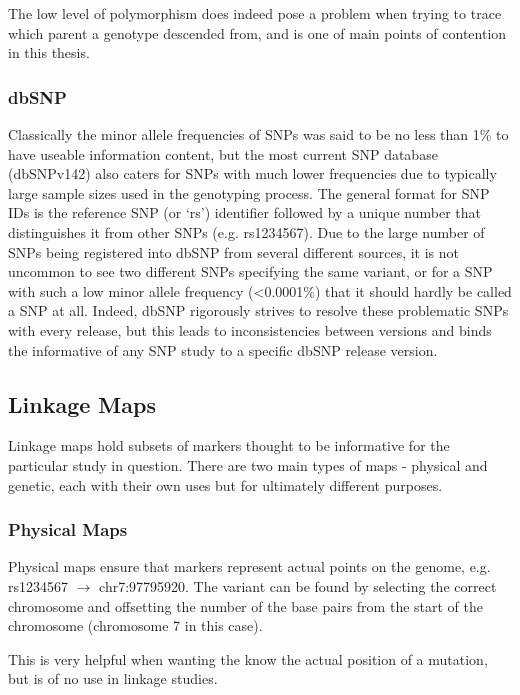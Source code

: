 The low level of polymorphism does indeed pose a problem when trying to trace which parent a genotype descended from, and is one of main points of contention in this thesis. 

\subsubsection{dbSNP}

Classically the minor allele frequencies of SNPs was said to be no less than 1\% to have useable information content, but the most current SNP database (dbSNPv142) also caters for SNPs with much lower frequencies due to typically large sample sizes used in the genotyping process. The general format for SNP IDs is the reference SNP (or ‘rs’) identifier followed by a unique number that distinguishes it from other SNPs (e.g. rs1234567).  Due to the large number of SNPs being registered into dbSNP from several different sources, it is not uncommon to see two different SNPs specifying the same variant, or for a SNP with such a low minor allele frequency (<0.0001\%) that it should hardly be called a SNP at all. Indeed, dbSNP rigorously strives to resolve these problematic SNPs with every release, but this leads to inconsistencies between versions and binds the informative of any SNP study to a specific dbSNP release version.


\subsection{Linkage Maps}

Linkage maps hold subsets of markers thought to be informative for the particular study in question. There are two main types of maps - physical and genetic, each with their own uses but for ultimately different purposes.


\subsubsection{Physical Maps}

Physical maps ensure that markers represent actual points on the genome, e.g. rs1234567 \(\rightarrow\) chr7:97795920. The variant can be found by selecting the correct chromosome and offsetting the number of the base pairs from the start of the chromosome (chromosome 7 in this case).

This is very helpful when wanting the know the actual position of a mutation, but is of no use in linkage studies.


